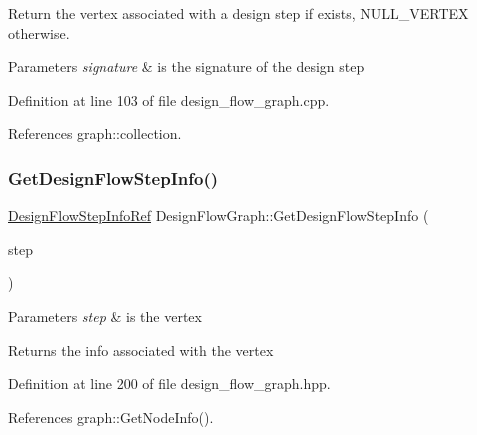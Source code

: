 Return the vertex associated with a design step if exists, N\+U\+L\+L\+\_\+\+V\+E\+R\+T\+EX otherwise. 


\begin{DoxyParams}{Parameters}
{\em signature} & is the signature of the design step \\
\hline
\end{DoxyParams}


Definition at line 103 of file design\+\_\+flow\+\_\+graph.\+cpp.



References graph\+::collection.

\mbox{\label{classDesignFlowGraph_adb71a3b457e5865e877470562c3d2165}} 
\subsubsection{\texorpdfstring{Get\+Design\+Flow\+Step\+Info()}{GetDesignFlowStepInfo()}}
{\footnotesize\ttfamily \hyperlink{design__flow__graph_8hpp_a6c29654e11949ccdea9e43f8ec64e7a9}{Design\+Flow\+Step\+Info\+Ref} Design\+Flow\+Graph\+::\+Get\+Design\+Flow\+Step\+Info (\begin{DoxyParamCaption}\item[{const \hyperlink{graph_8hpp_abefdcf0544e601805af44eca032cca14}{vertex}}]{step }\end{DoxyParamCaption})\hspace{0.3cm}{\ttfamily [inline]}}


\begin{DoxyParams}{Parameters}
{\em step} & is the vertex \\
\hline
\end{DoxyParams}
\begin{DoxyReturn}{Returns}
the info associated with the vertex 
\end{DoxyReturn}


Definition at line 200 of file design\+\_\+flow\+\_\+graph.\+hpp.



References graph\+::\+Get\+Node\+Info().


